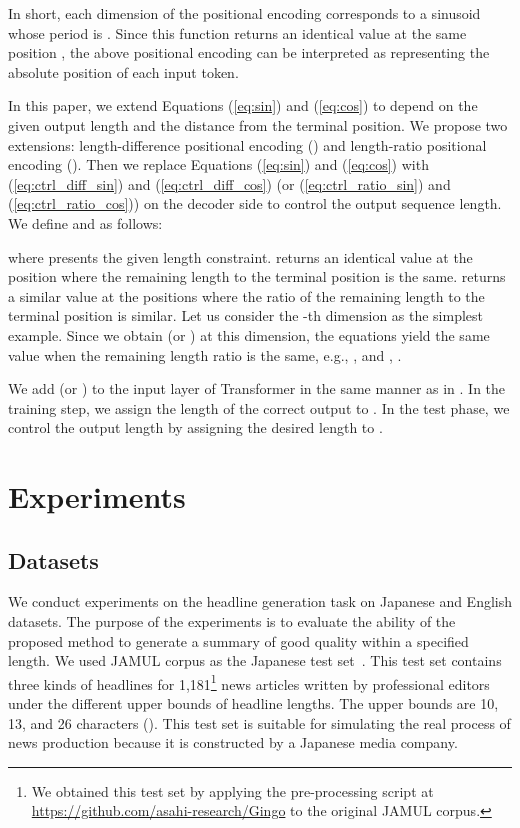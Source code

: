 \documentclass[11pt,a4paper]{article}
\begin{document}
In short, each dimension of the positional encoding corresponds to a sinusoid whose period is .
Since this function returns an identical value at the same position , the above positional encoding can be interpreted as representing the absolute position of each input token.


In this paper, we extend Equations (\ref{eq:sin}) and (\ref{eq:cos}) to depend on the given output length and the distance from the terminal position.
We propose two extensions: length-difference positional encoding () and length-ratio positional encoding ().
Then we replace Equations (\ref{eq:sin}) and (\ref{eq:cos}) with (\ref{eq:ctrl_diff_sin}) and (\ref{eq:ctrl_diff_cos}) (or (\ref{eq:ctrl_ratio_sin}) and (\ref{eq:ctrl_ratio_cos})) on the decoder side to control the output sequence length.
We define  and  as follows:

where  presents the given length constraint.
 returns an identical value at the position where the remaining length to the terminal position is the same.
 returns a similar value at the positions where the ratio of the remaining length to the terminal position is similar.
Let us consider the -th dimension as the simplest example.
Since we obtain  (or ) at this dimension, the equations yield the same value when the remaining length ratio is the same, e.g., ,  and , .


We add  (or ) to the input layer of Transformer in the same manner as in .
In the training step, we assign the length of the correct output to .
In the test phase, we control the output length by assigning the desired length to .


\section{Experiments}
\subsection{Datasets}
We conduct experiments on the headline generation task on Japanese and English datasets.
The purpose of the experiments is to evaluate the ability of the proposed method to generate a summary of good quality within a specified length.
We used JAMUL corpus as the Japanese test set~\cite{Hitomi2019}.
This test set contains three kinds of headlines for 1,181\footnote{We obtained this test set by applying the pre-processing script at \href{https://github.com/asahi-research/Gingo}{https://github.com/asahi-research/Gingo} to the original JAMUL corpus.} news articles written by professional editors under the different upper bounds of headline lengths.
The upper bounds are 10, 13, and 26 characters ().
This test set is suitable for simulating the real process of news production because it is constructed by a Japanese media company.
\end{document}
